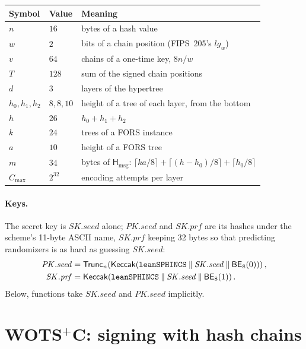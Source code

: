 \documentclass[11pt]{article}
\newcommand{\keccak}{\mathsf{Keccak}}
\newcommand{\Hmsg}{\mathsf{H}_{\mathrm{msg}}}
\newcommand{\BE}{\mathsf{BE}}
\newcommand{\Truncate}{\mathsf{Trunc}}
\newcommand{\concat}{\mathbin\Vert}
\newcommand{\pkseed}{\mathit{PK.seed}}
\newcommand{\skseed}{\mathit{SK.seed}}
\newcommand{\skprf}{\mathit{SK.prf}}
\newcommand{\cmax}{C_{\max}}
\begin{document}
\begin{center}
\begin{tabular}{@{}lll@{}}
\toprule
Symbol & Value & Meaning\\
\midrule
$n$ & $16$ & bytes of a hash value\\
$w$ & $2$ & bits of a chain position (FIPS~205's $\mathit{lg}_w$)\\
$v$ & $64$ & chains of a one-time key, $8n/w$\\
$T$ & $128$ & sum of the signed chain positions\\
$d$ & $3$ & layers of the hypertree\\
$h_0,h_1,h_2$ & $8,8,10$ & height of a tree of each layer, from the bottom\\
$h$ & $26$ & $h_0+h_1+h_2$\\
$k$ & $24$ & trees of a FORS instance\\
$a$ & $10$ & height of a FORS tree\\
$m$ & $34$ & bytes of $\Hmsg$: $\lceil ka/8\rceil+\lceil(h-h_0)/8\rceil+\lceil h_0/8\rceil$\\
$\cmax$ & $2^{32}$ & encoding attempts per layer\\
\bottomrule
\end{tabular}
\end{center}

\paragraph{Keys.}
\label{sec:keys}
The secret key is $\skseed$ alone; $\pkseed$ and $\skprf$ are its hashes under the scheme's 11-byte ASCII name, $\skprf$ keeping 32 bytes so that predicting randomizers is as hard as guessing $\skseed$:
\[
\begin{aligned}
  \pkseed&=\Truncate_n\!\left(\keccak\!\left(\text{\texttt{leanSPHINCS}}\concat\skseed\concat\BE_8(0)\right)\right),\\
  \skprf&=\keccak\!\left(\text{\texttt{leanSPHINCS}}\concat\skseed\concat\BE_8(1)\right).
\end{aligned}
\]
Below, functions take $\skseed$ and $\pkseed$ implicitly.

\section{\texorpdfstring{WOTS$^+$C}{WOTS+C}: signing with hash chains}
\label{sec:ots}
\end{document}
